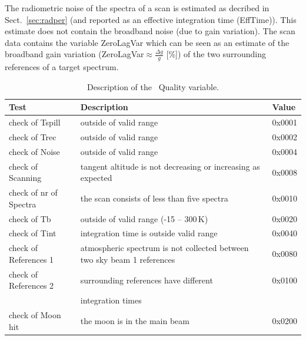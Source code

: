 The radiometric noise of the spectra of a scan is estimated as decribed  
in Sect.~\ref{sec:radper} (and reported as an effective integration time (EffTime)).
This estimate does not contain the broadband noise (due to gain variation). 
The scan data contains the variable ZeroLagVar which can be seen as an estimate
of the broadband gain variation (ZeroLagVar\(\approx \frac{\Delta g}{g}\) [\%]) 
of the two surrounding references of a target spectrum. 
 

\begin{table}
\caption{ Description of the \smr\ Quality variable. }
\label{table:quality}
\begin{tabular}{|l|p{7cm}|l|}
  \hline
  \textbf{Test} & \textbf{Description} & \textbf{Value} \\
  \hline
  check of Tspill   & outside of valid range  & 0x0001 \\
  \hline
  check of Trec     & outside of valid range & 0x0002  \\
  \hline
  check of Noise    & outside of valid range & 0x0004  \\
  \hline
  check of Scanning & tangent altitude is not decreasing or increasing as expected & 0x0008 \\
  \hline
  check of nr of Spectra &  the scan consists of less than five spectra & 0x0010\\
  \hline
  check of Tb       & outside of valid range (-15 -- 300\,K) & 0x0020\\ 
  \hline
  check of Tint     & integration time is outside valid range & 0x0040\\
  \hline
  check of References 1 & atmospheric spectrum is not collected between two sky beam 1 references     & 0x0080\\
  \hline
  check of References 2 & surrounding references have different & 0x0100\\
                        & integration times                     & \\ 
  \hline check of Moon hit   & the moon is in the main beam          & 0x0200 \\

\hline
\end{tabular}
\end{table}



